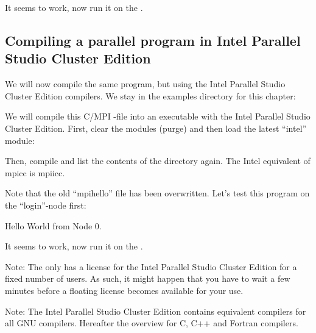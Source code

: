 It seems to work, now run it on the \hpc.

\begin{prompt}
\end{prompt}

\subsection{Compiling a parallel program in Intel Parallel Studio Cluster Edition}

We will now compile the same program, but using the Intel Parallel Studio
Cluster Edition compilers. We stay in the examples directory for this chapter:

\begin{prompt}
\end{prompt}

We will compile this C/MPI -file into an executable with the Intel Parallel Studio
Cluster Edition. First, clear the modules (purge) and then load the latest
``intel'' module:

\begin{prompt}
\end{prompt}

Then, compile and list the contents of the directory again. The Intel
equivalent of mpicc is mpiicc.

\begin{prompt}
\end{prompt}

Note that the old ``mpihello'' file has been overwritten.
Let's test this program on the ``login''-node first:

\begin{prompt}
Hello World from Node 0.
\end{prompt}

It seems to work, now run it on the \hpc.

\begin{prompt}
\end{prompt}

Note: The \association only has a license for the Intel Parallel Studio Cluster Edition for a
fixed number of users. As such, it might happen that you have to wait a few
minutes before a floating license becomes available for your use.

Note: The Intel Parallel Studio Cluster Edition contains equivalent compilers for all GNU
compilers. Hereafter the overview for C, C++ and Fortran compilers.

